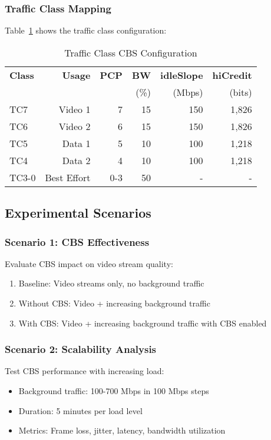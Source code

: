 \documentclass[10pt, journal, compsoc]{IEEEtran}
\begin{document}
\subsubsection{Traffic Class Mapping}

Table~\ref{tab:tc_mapping} shows the traffic class configuration:

\begin{table}[h]
\centering
\caption{Traffic Class CBS Configuration}
\label{tab:tc_mapping}
\begin{tabular}{lrrrrr}
\toprule
\textbf{Class} & \textbf{Usage} & \textbf{PCP} & \textbf{BW} & \textbf{idleSlope} & \textbf{hiCredit} \\
 & & & (\%) & (Mbps) & (bits) \\
\midrule
TC7 & Video 1 & 7 & 15 & 150 & 1,826 \\
TC6 & Video 2 & 6 & 15 & 150 & 1,826 \\
TC5 & Data 1 & 5 & 10 & 100 & 1,218 \\
TC4 & Data 2 & 4 & 10 & 100 & 1,218 \\
TC3-0 & Best Effort & 0-3 & 50 & - & - \\
\bottomrule
\end{tabular}
\end{table}

\subsection{Experimental Scenarios}

\subsubsection{Scenario 1: CBS Effectiveness}

Evaluate CBS impact on video stream quality:
\begin{enumerate}
    \item Baseline: Video streams only, no background traffic
    \item Without CBS: Video + increasing background traffic
    \item With CBS: Video + increasing background traffic with CBS enabled
\end{enumerate}

\subsubsection{Scenario 2: Scalability Analysis}

Test CBS performance with increasing load:
\begin{itemize}
    \item Background traffic: 100-700 Mbps in 100 Mbps steps
    \item Duration: 5 minutes per load level
    \item Metrics: Frame loss, jitter, latency, bandwidth utilization
\end{itemize}
\end{document}
